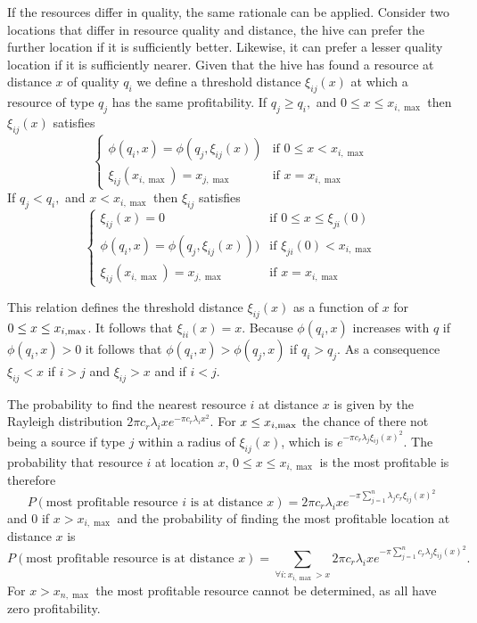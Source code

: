 \documentclass[12pt,letter]{amsart}
\newcommand{\df}[0]{{\,\rm d }}
\begin{document}
If the resources differ in quality, the same rationale can be applied. Consider two locations that differ in resource quality and distance, the hive can prefer the further location if it is sufficiently better. Likewise, it can prefer a lesser quality location if it is sufficiently nearer. Given that the hive has found a resource at distance $x$ of quality $q_i$ we define a threshold distance $\xi_{ij}(x)$ at which a resource of type $q_j$ has the same profitability. If  $q_j \ge q_i,$ and $0 \le  x \le x_{i,\max}$ then $\xi_{ij}(x)$ satisfies
\begin{equation*}
\left \{
\begin{array}{ll}
\phi(q_i,x)=\phi(q_j, \xi_{ij}(x)) & \text{if }0 \le  x<x_{i,\max}\\
\xi_{ij}(x_{i,\max})=x_{j,\max} & \text{if } x= x_{i,\max}
\end{array}
\right.
\end{equation*}
If  $q_j<q_i,$ and $x<x_{i,\max}$ then $\xi_{ij}$ satisfies
\begin{equation*}
\left \{
\begin{array}{ll}
\xi_{ij}(x)=0& \text{if } 0 \le x \le \xi_{ji}(0) \\
\phi(q_i,x)=\phi(q_j, \xi_{ij}(x)))& \text{if } \xi_{ji}(0)<x_{i,\max}\\
\xi_{ij}(x_{i,\max})=x_{j,\max} & \text{if } x= x_{i,\max}
\end{array}
\right.
\end{equation*}

This relation defines the threshold distance $\xi_{ij}(x)$ as a function of $x$ for $0 \le x \le x_{i,{\rm max}}$.
It follows that $\xi_{ii}(x)=x$. Because $\phi(q_i,x)$ increases with $q$ if $\phi(q_i,x)>0$ it follows that $\phi(q_i,x)>\phi(q_j,x)$ if $q_i>q_j$. As a consequence $\xi_{ij}<x$ if $i>j$ and $\xi_{ij}>x$ and if $i<j.$

The probability to find the nearest resource $i$ at distance $x$ is given by the Rayleigh distribution $2 \pi c_r \lambda_i x e^{-\pi c_r \lambda_i x^2 }.$ For $x \le x_{i, {\rm max}}$ the chance of there not being a source if type $j$ within a radius of $\xi_{ij}(x)$, which is $e^{- \pi c_r \lambda_j \xi_{ij}(x)^2}.$ The probability that resource $i$ at location $x$, $0 \le x \le x_{i,\max}$ is the most profitable is therefore
$$P(\textrm{most profitable resource }i \textrm{ is at distance } x)=2 \pi c_r \lambda_i x e^{- \pi \sum_{j=1}^n\lambda_j c_r \xi_{ij}(x)^2}$$ and 0 if $x > x_{i,\max}$
and the probability of finding the most profitable location at distance $x$ is
$$P(\textrm{most profitable resource is at distance } x )=\sum_{\forall i: {x_{i, \max}>x}} 2 \pi c_r \lambda_i x e^{- \pi \sum_{j=1}^n c_r \lambda_j \xi_{ij}(x)^2}.$$
For $x>x_{n, \max}$ the most profitable resource cannot be determined, as all have zero profitability.
\end{document}
